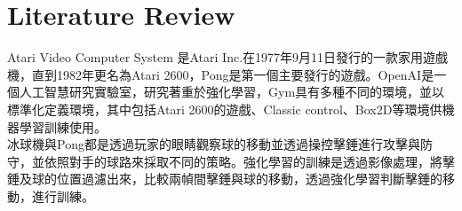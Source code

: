 \chapter{Literature Review}
Atari Video Computer System 是Atari Inc.在1977年9月11日發行的一款家用遊戲機，直到1982年更名為Atari 2600，Pong是第一個主要發行的遊戲。OpenAI是一個人工智慧研究實驗室，研究著重於強化學習，Gym具有多種不同的環境，並以標準化定義環境，其中包括Atari 2600的遊戲、Classic control、Box2D等環境供機器學習訓練使用。\\

冰球機與Pong都是透過玩家的眼睛觀察球的移動並透過操控擊錘進行攻擊與防守，並依照對手的球路來採取不同的策略。強化學習的訓練是透過影像處理，將擊錘及球的位置過濾出來，比較兩幀間擊錘與球的移動，透過強化學習判斷擊錘的移動，進行訓練。\\

